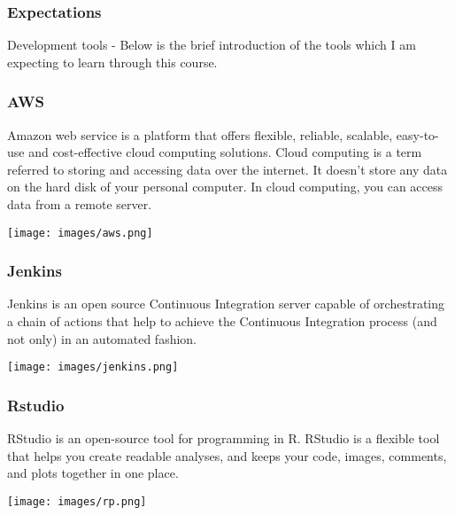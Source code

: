 \documentclass{beamer}
\begin{document}


\begin{frame}
\frametitle{Expectations}

  Development tools - \newline
  Below is the brief introduction of the tools which I am expecting to learn through this course.



\end{frame}

\begin{frame}
\frametitle{AWS}

Amazon web service is a platform that offers flexible, reliable, scalable, easy-to-use and cost-effective cloud computing solutions. Cloud computing is a term referred to storing and accessing data over the internet. It doesn't store any data on the hard disk of your personal computer. In cloud computing, you can access data from a remote server.
\begin{center}
 \texttt{[image: images/aws.png]}
\end{center}

\end{frame}


\begin{frame}
\frametitle{Jenkins}
Jenkins is an open source Continuous Integration server capable of orchestrating a chain of actions that help to achieve the Continuous Integration process (and not only) in an automated fashion.
\begin{center}
 \texttt{[image: images/jenkins.png]}
\end{center}


\end{frame}

\begin{frame}
\frametitle{Rstudio}
RStudio is an open-source tool for programming in R. RStudio is a flexible tool that helps you create readable analyses, and keeps your code, images, comments, and plots together in one place.

\begin{center}
 \texttt{[image: images/rp.png]}
\end{center}


\end{frame}
\end{document}
